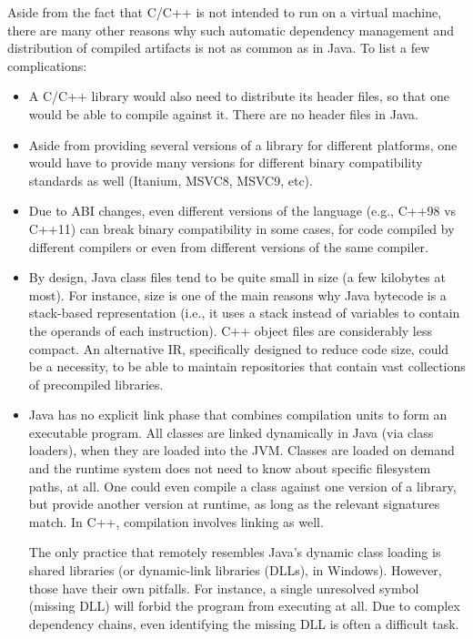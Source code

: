 Aside from the fact that C/C++ is not intended to run on a virtual
machine, there are many other reasons why such automatic dependency
management and distribution of compiled artifacts is not as common as
in Java. To list a few complications:
\begin{itemize}[--]
\item A C/C++ library would also need to distribute its header files,
  so that one would be able to compile against it. There are no header
  files in Java.
\item Aside from providing several versions of a library for different
  platforms, one would have to provide many versions for different
  binary compatibility standards as well (Itanium, MSVC8, MSVC9, etc).
\item Due to ABI changes, even different versions of the language
  (e.g., C++98 vs C++11) can break binary compatibility in some cases,
  for code compiled by different compilers or even from different
  versions of the same compiler.
\item By design, Java class files tend to be quite small in size (a
  few kilobytes at most). For instance, size is one of the main
  reasons why Java bytecode is a stack-based representation (i.e., it
  uses a stack instead of variables to contain the operands of each
  instruction). C++ object files are considerably less compact. An
  alternative IR, specifically designed to reduce code size, could be
  a necessity, to be able to maintain repositories that contain vast
  collections of precompiled libraries.
\item Java has no explicit link phase that combines compilation units
  to form an executable program. All classes are linked dynamically in
  Java (via class loaders), when they are loaded into the JVM. Classes
  are loaded on demand and the runtime system does not need to know
  about specific filesystem paths, at all. One could even compile a
  class against one version of a library, but provide another version
  at runtime, as long as the relevant signatures match.  In C++,
  compilation involves linking as well.

  The only practice that remotely resembles Java's dynamic class
  loading is shared libraries (or dynamic-link libraries (DLLs), in
  Windows). However, those have their own pitfalls. For instance, a
  single unresolved symbol (missing DLL) will forbid the program from
  executing at all. Due to complex dependency chains, even identifying
  the missing DLL is often a difficult task.
\end{itemize}

